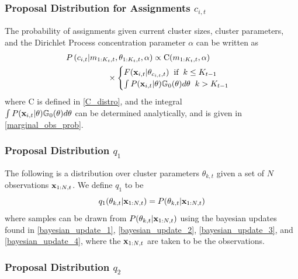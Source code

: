 \documentclass[twocolumn, final]{svjour3}
\begin{document}
\subsubsection{Proposal Distribution for Assignments $c_{i,t}$}
\label{sec:smc_proposal_1}

The probability of assignments given current cluster sizes, cluster parameters, and the Dirichlet Process concentration parameter $\alpha$ can be written as
\begin{align}
\begin{split}
\label{smc_assig_eqn}
P &\left( c_{i,t} | m_{1:K_{t}, t}, \theta_{1:K_{t}, t}, \alpha \right) \propto
\text{C}(m_{1:K_{t}, t}, \alpha) \\ 
& \hspace{15mm}\times
\begin{cases}
F(\bold{x}_{i,t} | \theta_{c_{i,t},t}) \hspace{2mm} \text{if} \hspace{2mm} k \leq K_{t-1} \\
\int P(\bold{x}_{i,t} | \theta) \mathbb{G}_{0}(\theta)d\theta \hspace{2mm} k > K_{t-1}
\end{cases}
\end{split}
\end{align}
where C is defined in \eqref{C_distro}, and the integral \\
$\int P(\bold{x}_{i,t} | \theta) \mathbb{G}_{0}(\theta)d\theta$ can be determined analytically, and is given in \eqref{marginal_obs_prob}.


\subsubsection{Proposal Distribution $q_{1}$}
\label{sec:smc_proposal_2}

The following is a distribution over cluster parameters $\theta_{k,t}$ given a set of $N$ observations $\bold{x}_{1:N, t}$. We define $q_{1}$ to be
\begin{equation}
\label{smc_q1_eqn}
q_{1}(\theta_{k,t} | \bold{x}_{1:N,t}) = P(\theta_{k,t} | \bold{x}_{1:N,t})
\end{equation}
where samples can be drawn from $P(\theta_{k,t} | \bold{x}_{1:N,t})$ using the bayesian updates found in \eqref{bayesian_update_1}, \eqref{bayesian_update_2}, \eqref{bayesian_update_3}, and \eqref{bayesian_update_4}, where the $\bold{x}_{1:N,t}$ are taken to be the observations.


\subsubsection{Proposal Distribution $q_{2}$}
\label{sec:smc_proposal_3}
\end{document}
